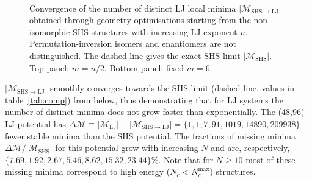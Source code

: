 \begin{figure}[htbp]
    \centering
    \\
    \caption{Convergence of the number of distinct \acs{LJ} local minima
    $|\mathcal{M}_\mathrm{SHS\to LJ}|$ obtained through geometry optimisations
    starting from the non-isomorphic \acs{SHS} structures with increasing
    \acs{LJ} exponent $n$. Permutation-inversion isomers and enantiomers are not
    distinguished. The dashed line gives the exact \acs{SHS} limit
    $|\mathcal{M}_\mathrm{SHS}|$. Top panel: $m=n/2$. Bottom panel: fixed
    $m=6$.}
    \label{fig:expinfty}
\end{figure}
%
$|\mathcal{M}_\mathrm{SHS\to LJ}|$ smoothly converges towards the \ac{SHS} limit
(dashed line, values in table~\ref{tab:comp}) from below, thus demonstrating
that for \ac{LJ} systems the number of distinct minima does not grow faster than
exponentially. The (48,96)-\ac{LJ} potential has $\Delta\mathcal{M} \equiv
|\mathcal{M}_\mathrm{LJ}| - |\mathcal{M}_\mathrm{SHS\to LJ}| =
\{1,1,7,91,1019,14890,209938\}$ fewer stable minima than the \ac{SHS} potential.
The fractions of missing minima $\Delta\mathcal{M}/|\mathcal{M}_\mathrm{SHS}|$
for this potential grow with increasing $N$ and are, respectively,
$\{7.69,1.92,2.67,5.46,8.62,15.32,23.44\}\%$.  Note that for $N \geq 10$ most of
these missing minima correspond to high energy ($N_c < N_c^\mathrm{max}$)
structures.

